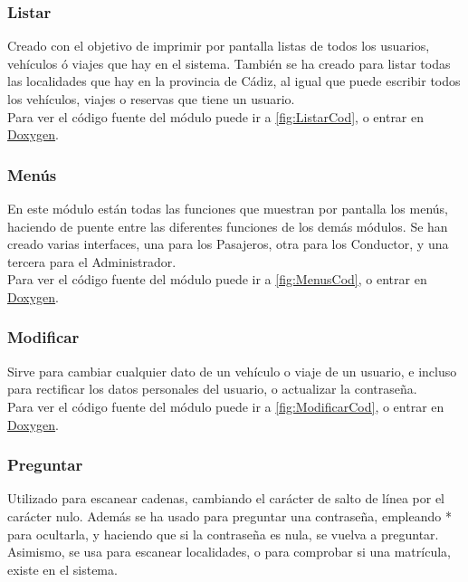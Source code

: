 \subsubsection{Listar}

Creado con el objetivo de imprimir por pantalla listas de todos los usuarios, vehículos ó viajes que hay en el sistema.
También se ha creado para listar todas las localidades que hay en la provincia de Cádiz, al igual que puede escribir todos los vehículos, viajes o reservas que tiene un usuario.\\

Para ver el código fuente del módulo puede ir a \ref{fig:ListarCod}, o entrar en \href{DOC_DOXYGEN/listar_8h_source.html}{Doxygen}.
\label{fig:Listar}

\subsubsection{Menús}

En este módulo están todas las funciones que muestran por pantalla los menús, haciendo de puente entre las diferentes funciones de los demás módulos.
Se han creado varias interfaces, una para los Pasajeros, otra para los Conductor, y una tercera para el Administrador.\\

Para ver el código fuente del módulo puede ir a \ref{fig:MenusCod}, o entrar en \href{DOC_DOXYGEN/menus_8h_source.html}{Doxygen}.
\label{fig:Menus}

\subsubsection{Modificar}

Sirve para cambiar cualquier dato de un vehículo o viaje de un usuario, e incluso para rectificar los datos personales del usuario, o actualizar la contraseña.\\

Para ver el código fuente del módulo puede ir a \ref{fig:ModificarCod}, o entrar en \href{DOC_DOXYGEN/modificar_8h_source.html}{Doxygen}.
\label{fig:Modificar}

\subsubsection{Preguntar}

Utilizado para escanear cadenas, cambiando el carácter de salto de línea por el carácter nulo. Además se ha usado para preguntar una contraseña,
empleando * para ocultarla, y haciendo que si la contraseña es nula, se vuelva a preguntar. Asimismo, se usa para escanear localidades, o para comprobar si una matrícula, existe en el sistema.\\

